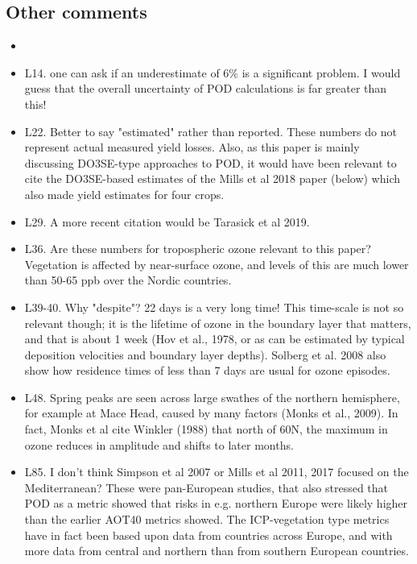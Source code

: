 \documentclass{scrartcl}
\begin{document}
\subsection*{Other comments} 
\begin{itemize}
    
\item {\color{blue}}

\item {\color{blue}L14. one can ask if an underestimate of 6\% is a significant problem. I would guess that the overall uncertainty of POD calculations is far greater than this!}

\item {\color{blue}L22. Better to say "estimated" rather than reported. These numbers do not represent actual measured yield losses. Also, as this paper is mainly discussing DO3SE-type approaches to POD, it would have been relevant to cite the DO3SE-based estimates of the Mills et al 2018 paper (below) which also made yield estimates for four crops.}

\item {\color{blue}L29. A more recent citation would be Tarasick et al 2019.}

\item {\color{blue}L36. Are these numbers for tropospheric ozone relevant to this paper? Vegetation is affected by near-surface ozone, and levels of this are much lower than 50-65 ppb over the Nordic countries.}

\item {\color{blue}L39-40. Why "despite"? 22 days is a very long time! This time-scale is not so relevant though; it is the lifetime of ozone in the boundary layer that matters, and that is about 1 week (Hov et al., 1978, or as can be estimated by typical deposition velocities and boundary layer depths). Solberg et al. 2008 also show how residence times of less than 7 days are usual for ozone episodes.}

\item {\color{blue}L48. Spring peaks are seen across large swathes of the northern hemisphere, for example at Mace Head, caused by many factors (Monks et al., 2009). In fact, Monks et al cite Winkler (1988) that north of 60N, the maximum in ozone reduces in amplitude and shifts to later months.}

\item {\color{blue}L85. I don't think Simpson et al 2007 or Mills et al 2011, 2017 focused on the Mediterranean? These were pan-European studies, that also stressed that POD as a metric showed that risks in e.g. northern Europe were likely higher than the earlier AOT40 metrics showed. The ICP-vegetation type metrics have in fact been based upon data from countries across Europe, and with more data from central and northern than from southern European countries.}


\end{itemize}
\end{document}
